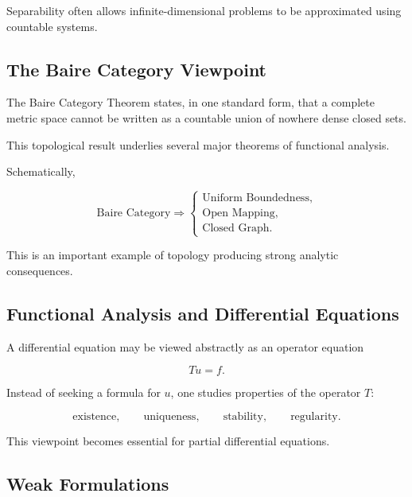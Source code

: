 Separability often allows infinite-dimensional problems to be approximated
using countable systems.

\subsection{The Baire Category Viewpoint}
\label{subsec:baire-functional-analysis}

The Baire Category Theorem states, in one standard form, that a complete
metric space cannot be written as a countable union of nowhere dense
closed sets.

This topological result underlies several major theorems of functional
analysis.

Schematically,

\[
\boxed{
\text{Baire Category}
\Longrightarrow
\begin{cases}
\text{Uniform Boundedness},\\
\text{Open Mapping},\\
\text{Closed Graph}.
\end{cases}
}
\]

This is an important example of topology producing strong analytic
consequences.

\subsection{Functional Analysis and Differential Equations}
\label{subsec:functional-analysis-differential-equations}

A differential equation may be viewed abstractly as an operator equation

\[
\boxed{
Tu=f.
}
\]

Instead of seeking a formula for \(u\), one studies properties of the
operator \(T\):

\[
\boxed{
\text{existence},
\qquad
\text{uniqueness},
\qquad
\text{stability},
\qquad
\text{regularity}.
}
\]

This viewpoint becomes essential for partial differential equations.

\subsection{Weak Formulations}
\label{subsec:weak-formulations-functional}

